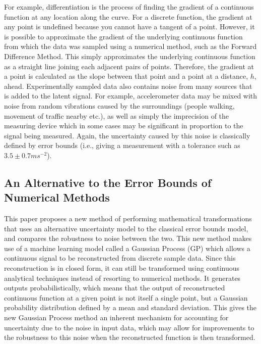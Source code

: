 \documentclass[12pt]{article}
\begin{document}
    For example, differentiation is the process of finding the gradient of a continuous function at any location along the curve.
    For a discrete function, the gradient at any point is undefined because you cannot have a tangent of a point.
    However, it is possible to approximate the gradient of the underlying continuous function from which the data was sampled using a numerical method, such as the Forward Difference Method.
    This simply approximates the underlying continuous function as a straight line joining each adjacent pairs of points.
    Therefore, the gradient at a point is calculated as the slope between that point and a point at a distance, $h$, ahead.
    Experimentally sampled data also contains noise from many sources that is added to the latent signal.
    For example, accelerometer data may be mixed with noise from random vibrations caused by the surroundings (people walking, movement of traffic nearby etc.), as well as simply the imprecision of the measuring device which in some cases may be significant in proportion to the signal being measured.
    Again, the uncertainty caused by this noise is classically defined by error bounds (i.e., giving a measurement with a tolerance such as $3.5 \pm 0.7 ms^{-2}$).

    \subsection{An Alternative to the Error Bounds of Numerical Methods}

    This paper proposes a new method of performing mathematical transformations that uses an alternative uncertainty model to the classical error bounds model, and compares the robustness to noise between the two.
    This new method makes use of a machine learning model called a Gaussian Process (GP) which allows a continuous signal to be reconstructed from discrete sample data.
    Since this reconstruction is in closed form, it can still be transformed using continuous analytical techniques instead of resorting to numerical methods.
    It generates outputs probabilistically, which means that the output of reconstructed continuous function at a given point is not itself a single point, but a Gaussian probability distribution defined by a mean and standard deviation.
    This gives the new Gaussian Process method an inherent mechanism for accounting for uncertainty due to the noise in input data, which may allow for improvements to the robustness to this noise when the reconstructed function is then transformed.
\end{document}
